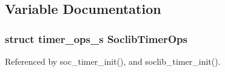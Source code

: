 \subsection{Variable Documentation}
\hypertarget{soclib-timer_8h_aa3f96a0578c32ac8fd0d3b2526182084}{
\subsubsection[{Soclib\-Timer\-Ops}]{\setlength{\rightskip}{0pt plus 5cm}struct {\bf timer\-\_\-ops\-\_\-s} Soclib\-Timer\-Ops}}\label{soclib-timer_8h_aa3f96a0578c32ac8fd0d3b2526182084}


Referenced by soc\-\_\-timer\-\_\-init(), and soclib\-\_\-timer\-\_\-init().

